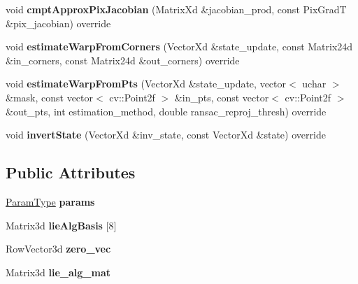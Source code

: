 \begin{DoxyCompactItemize}
\item 
\hypertarget{classLieAffine_a84af68ca735c6dbd20661c57edcb9336}{void {\bfseries cmpt\-Approx\-Pix\-Jacobian} (Matrix\-Xd \&jacobian\-\_\-prod, const Pix\-Grad\-T \&pix\-\_\-jacobian) override}\label{classLieAffine_a84af68ca735c6dbd20661c57edcb9336}

\item 
\hypertarget{classLieAffine_a2d2b8f37d208c39eccd82781db87add2}{void {\bfseries estimate\-Warp\-From\-Corners} (Vector\-Xd \&state\-\_\-update, const Matrix24d \&in\-\_\-corners, const Matrix24d \&out\-\_\-corners) override}\label{classLieAffine_a2d2b8f37d208c39eccd82781db87add2}

\item 
\hypertarget{classLieAffine_afbad040b5581f2503ad217f9f56796eb}{void {\bfseries estimate\-Warp\-From\-Pts} (Vector\-Xd \&state\-\_\-update, vector$<$ uchar $>$ \&mask, const vector$<$ cv\-::\-Point2f $>$ \&in\-\_\-pts, const vector$<$ cv\-::\-Point2f $>$ \&out\-\_\-pts, int estimation\-\_\-method, double ransac\-\_\-reproj\-\_\-thresh) override}\label{classLieAffine_afbad040b5581f2503ad217f9f56796eb}

\item 
\hypertarget{classLieAffine_ae2a1d44032931fb22c07588306ad5b83}{void {\bfseries invert\-State} (Vector\-Xd \&inv\-\_\-state, const Vector\-Xd \&state) override}\label{classLieAffine_ae2a1d44032931fb22c07588306ad5b83}

\end{DoxyCompactItemize}
\subsection*{Public Attributes}
\begin{DoxyCompactItemize}
\item 
\hypertarget{classLieAffine_a34468baac11abb1c23e520bdafd6a3ae}{\hyperlink{structLieAffineParams}{Param\-Type} {\bfseries params}}\label{classLieAffine_a34468baac11abb1c23e520bdafd6a3ae}

\item 
\hypertarget{classLieAffine_a12ef39544ef06d40d9b268a35f419af6}{Matrix3d {\bfseries lie\-Alg\-Basis} \mbox{[}8\mbox{]}}\label{classLieAffine_a12ef39544ef06d40d9b268a35f419af6}

\item 
\hypertarget{classLieAffine_a48a2365ce7a10569f1451b56c4454336}{Row\-Vector3d {\bfseries zero\-\_\-vec}}\label{classLieAffine_a48a2365ce7a10569f1451b56c4454336}

\item 
\hypertarget{classLieAffine_aa3fe521295bec316a5737d5231672796}{Matrix3d {\bfseries lie\-\_\-alg\-\_\-mat}}\label{classLieAffine_aa3fe521295bec316a5737d5231672796}

\end{DoxyCompactItemize}
